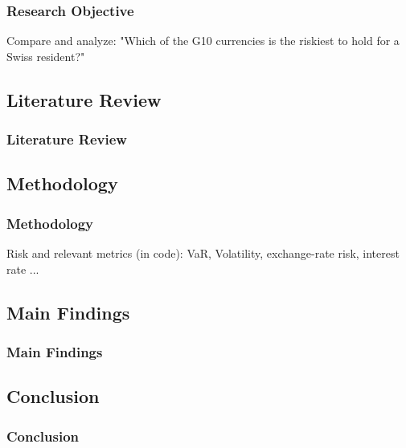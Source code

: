 \documentclass[10pt]{beamer}
\begin{document}
\begin{frame}
\frametitle{Research Objective}
Compare and analyze: "Which of the G10 currencies is the riskiest to hold for a Swiss resident?"
\end{frame}
\begin{frame}
\section{Literature Review}
\frametitle{Literature Review}

\end{frame}
\begin{frame}
\section{Methodology}
\frametitle{Methodology}
Risk and relevant metrics (in code): VaR, Volatility, exchange-rate risk, interest rate ...
\end{frame}
\begin{frame}
\section{Main Findings}
\frametitle{Main Findings}

\end{frame}
\begin{frame}
\section{Conclusion}
\frametitle{Conclusion}

\end{frame}
\end{document}
